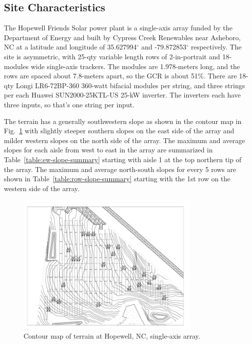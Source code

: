 \documentclass[conference]{IEEEtran}
\begin{document}
\subsection{Site Characteristics}

The Hopewell Friends Solar power plant is a single-axis array funded by the Department of Energy and built by Cypress Creek Renewables \cite{CypressCreekRenewables2019} near Asheboro, NC at a latitude and longitude of 35.627994$^\circ$ and -79.872853$^\circ$ respectively. The site is asymmetric, with 25-qty variable length rows of 2-in-portrait and 18-modules wide single-axis trackers. The modules are 1.978-meters long, and the rows are spaced about 7.8-meters apart, so the GCR is about 51\%. There are 18-qty Longi LR6-72BP-360 360-watt bifacial modules per string, and three strings per each Huawei SUN2000-25KTL-US 25-kW inverter. The inverters each have three inputs, so that's one string per input.

The terrain has a generally southwestern slope as shown in the contour map in Fig.~\ref{fig:hopewell_contour_map} with slightly steeper southern slopes on the east side of the array and milder western slopes on the north side of the array. The maximum and average slopes for each aisle from west to east in the array are summarized in Table~\ref{table:ew-slope-summary} starting with aisle 1 at the top northern tip of the array. The maximum and average north-south slopes for every 5 rows are shown in Table~\ref{table:row-slope-summary} starting with the 1st row on the western side of the array.

\begin{figure}[htbp]
\centerline{\includegraphics[width=9cm]{Hopewell_Civil_Base.png}}
\caption{Contour map of terrain at Hopewell, NC, single-axis array.}
\label{fig:hopewell_contour_map}
\end{figure}
\end{document}

